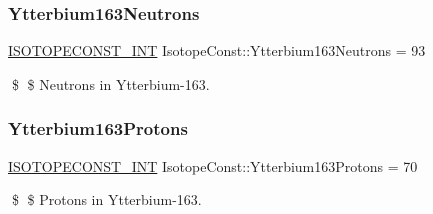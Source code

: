 \subsubsection{\texorpdfstring{Ytterbium163\+Neutrons}{Ytterbium163Neutrons}}
{\footnotesize\ttfamily \mbox{\hyperlink{group___isotope_const-_macros_ga5f18360b3e99483a35c32d789e62621c}{I\+S\+O\+T\+O\+P\+E\+C\+O\+N\+S\+T\+\_\+\+I\+NT}} Isotope\+Const\+::\+Ytterbium163\+Neutrons = 93}

\$ \$ Neutrons in Ytterbium-\/163. \mbox{\label{group___isotope_const-_ytterbium-_yb163_ga3c0ba38bd1cbc63396304cc8a696d3b3}} 
\subsubsection{\texorpdfstring{Ytterbium163\+Protons}{Ytterbium163Protons}}
{\footnotesize\ttfamily \mbox{\hyperlink{group___isotope_const-_macros_ga5f18360b3e99483a35c32d789e62621c}{I\+S\+O\+T\+O\+P\+E\+C\+O\+N\+S\+T\+\_\+\+I\+NT}} Isotope\+Const\+::\+Ytterbium163\+Protons = 70}

\$ \$ Protons in Ytterbium-\/163. 